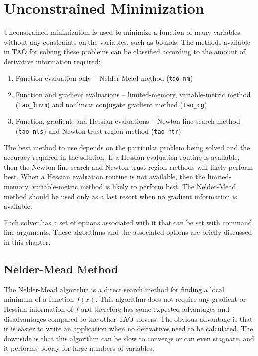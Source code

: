\documentclass[]{book}
\begin{document}
\section{Unconstrained Minimization}
\label{chapter:unconstrained}
Unconstrained minimization is used to minimize a function of many variables
without any constraints on the variables, such as bounds.  The methods 
available in TAO for solving these problems can be classified according
to the amount of derivative information required:
\begin{enumerate}
\item Function evaluation only -- Nelder-Mead method ({\tt tao\_nm})
\item Function and gradient evaluations -- limited-memory, variable-metric 
method ({\tt tao\_lmvm}) and nonlinear conjugate gradient method 
({\tt tao\_cg})
\item Function, gradient, and Hessian evaluations -- Newton line search 
method ({\tt tao\_nls}) and Newton trust-region method ({\tt tao\_ntr})
\end{enumerate}
The best method to use depends on the particular problem being solved
and the accuracy required in the solution.  If a Hessian evaluation 
routine is available, then the Newton line search and Newton trust-region 
methods will likely perform best.  When a Hessian evaluation routine
is not available, then the limited-memory, variable-metric method is 
likely to perform best.  The Nelder-Mead method should be used only
as a last resort when no gradient information is available.

Each solver has a set of options associated with it that can be set with 
command line arguments.  These algorithms and the 
associated options are briefly discussed in this chapter.

\subsection{Nelder-Mead Method}
The Nelder-Mead algorithm \cite{nelder.mead:simplex} is a direct search method for finding a local
minimum of a function $f(x)$.  This algorithm does not require any gradient or Hessian 
information of $f$ and therefore has some expected advantages and disadvantages compared
to the other TAO solvers.  The obvious advantage is that it is easier to write an 
application when no derivatives need to be calculated.  The downside is that this algorithm can
be slow to converge or can even stagnate, and it performs poorly for large numbers of variables.
\end{document}
